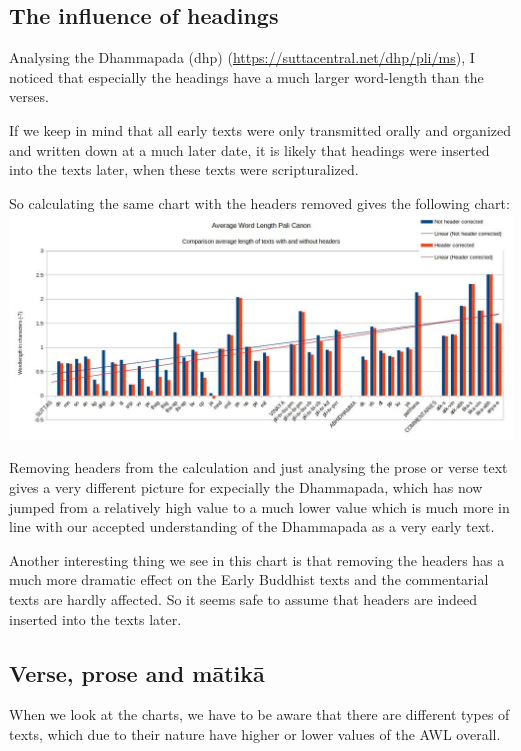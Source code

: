 \subsection{The influence of headings}
Analysing the Dhammapada (dhp) (\url{https://suttacentral.net/dhp/pli/ms}), I noticed that especially the headings have a much larger word-length than the verses. 

If we keep in mind that all early texts were only transmitted orally and organized and written down at a much later date, it is likely that headings were inserted into the texts later, when these texts were scripturalized.

So calculating the same chart with the headers removed gives the following chart:\\

\includegraphics[width=\linewidth]{chart2.jpg}
\label{chart2}

\medskip
Removing headers from the calculation and just analysing the prose or verse text gives a very different picture for expecially the Dhammapada, which has now jumped from a relatively high value to a much lower value which is much more in line with our accepted understanding of the Dhammapada as a very early text.

Another interesting thing we see in this chart is that removing the headers has a much more dramatic effect on the Early Buddhist texts and the commentarial texts are hardly affected. So it seems safe to assume that headers are indeed inserted into the texts later.

\subsection{Verse, prose and mātikā}
When we look at the charts, we have to be aware that there are different types of texts, which due to their nature have higher or lower values of the AWL overall. 

